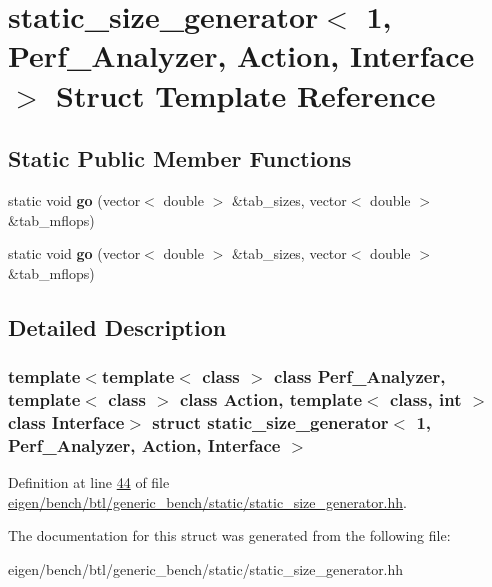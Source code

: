 \hypertarget{structstatic__size__generator_3_011_00_01_perf___analyzer_00_01_action_00_01_interface_01_4}{}\section{static\+\_\+size\+\_\+generator$<$ 1, Perf\+\_\+\+Analyzer, Action, Interface $>$ Struct Template Reference}
\label{structstatic__size__generator_3_011_00_01_perf___analyzer_00_01_action_00_01_interface_01_4}
\subsection*{Static Public Member Functions}
\begin{DoxyCompactItemize}
\item 
\mbox{\label{structstatic__size__generator_3_011_00_01_perf___analyzer_00_01_action_00_01_interface_01_4_a21a89a4606a9740fcd8d95b6d3607f6e}} 
static void {\bfseries go} (vector$<$ double $>$ \&tab\+\_\+sizes, vector$<$ double $>$ \&tab\+\_\+mflops)
\item 
\mbox{\label{structstatic__size__generator_3_011_00_01_perf___analyzer_00_01_action_00_01_interface_01_4_a21a89a4606a9740fcd8d95b6d3607f6e}} 
static void {\bfseries go} (vector$<$ double $>$ \&tab\+\_\+sizes, vector$<$ double $>$ \&tab\+\_\+mflops)
\end{DoxyCompactItemize}


\subsection{Detailed Description}
\subsubsection*{template$<$template$<$ class $>$ class Perf\+\_\+\+Analyzer, template$<$ class $>$ class Action, template$<$ class, int $>$ class Interface$>$\newline
struct static\+\_\+size\+\_\+generator$<$ 1, Perf\+\_\+\+Analyzer, Action, Interface $>$}



Definition at line \hyperlink{eigen_2bench_2btl_2generic__bench_2static_2static__size__generator_8hh_source_l00044}{44} of file \hyperlink{eigen_2bench_2btl_2generic__bench_2static_2static__size__generator_8hh_source}{eigen/bench/btl/generic\+\_\+bench/static/static\+\_\+size\+\_\+generator.\+hh}.



The documentation for this struct was generated from the following file\+:\begin{DoxyCompactItemize}
\item 
eigen/bench/btl/generic\+\_\+bench/static/static\+\_\+size\+\_\+generator.\+hh\end{DoxyCompactItemize}
